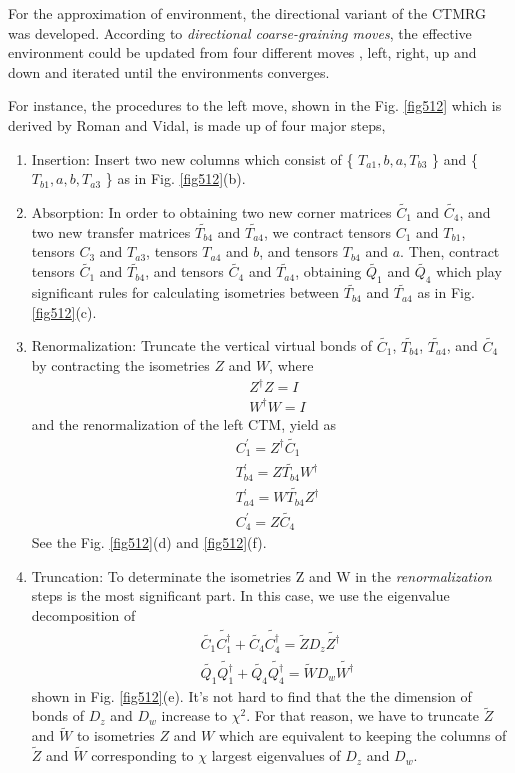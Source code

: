 For the approximation of environment, the directional variant of the CTMRG was developed. According to \textit{directional coarse-graining moves}, the effective environment could be updated from four different moves , left, right, up and down and iterated until the environments converges. 

For instance, the procedures to the left move, shown in the Fig. \ref{fig512} which is derived by Roman and Vidal, is made up of four major steps,
\begin{enumerate}
	\item Insertion: Insert two new columns which consist of \{ $T_{a1},b,a,T_{b3}$ \} and \{ $T_{b1},a,b,T_{a3}$ \} as in Fig. \ref{fig512}(b).
	\item Absorption: In order to obtaining two new corner matrices $\tilde{C_1}$ and $\tilde{C_4}$, and two new transfer matrices $\tilde{T_{b4}}$ and $\tilde{T_{a4}}$, we contract tensors $C_1$ and $T_{b1}$, tensors $C_3$ and $T_{a3}$, tensors $T_{a4}$ and $b$, and tensors $T_{b4}$ and $a$. Then, contract tensors $\tilde{C_1}$ and $\tilde{T_{b4}}$, and tensors $\tilde{C_4}$ and $\tilde{T_{a4}}$, obtaining $\tilde{Q_1}$ and $\tilde{Q_4}$ which play significant rules for calculating isometries between $\tilde{T_{b4}}$ and $\tilde{T_{a4}}$ as in Fig. \ref{fig512}(c).
	\item Renormalization: Truncate the vertical virtual bonds of $\widetilde{C_1}$, $\widetilde{T_{b4}}$, $\widetilde{T_{a4}}$, and $\widetilde{C_4}$ by contracting the isometries $Z$ and $W$, where
\begin{align}
	\label{isometry}
	&Z^{\dagger}Z = I \\
	&W^{\dagger}W = I
\end{align}
and the renormalization of the left CTM, yield as
\begin{align}
	\label{renormalize}
	&C^{\prime}_1 = Z^{\dagger} \tilde{C_1} \\
	&T_{b4}^{\prime} = Z\tilde{T_{b4}}W^{\dagger} \\
	&T_{a4}^{\prime} = W\tilde{T_{b4}}Z^{\dagger} \\
	&C^{\prime}_4 = Z\widetilde{C_4}
\end{align}
See the Fig. \ref{fig512}(d) and \ref{fig512}(f).
	\item Truncation: To determinate the isometries Z and W in the \textit{renormalization} steps is the most significant part. In this case, we use the eigenvalue decomposition of 
		\begin{align}
			\label{eigh_ctm}
			&\tilde{C_1}\tilde{C^{\dagger}_1}+\tilde{C_4}\tilde{C^{\dagger}_4}= \tilde{Z} D_z \tilde{Z^{\dagger}}\\
			&\tilde{Q_1}\tilde{Q^{\dagger}_1}+\tilde{Q_4}\tilde{Q^{\dagger}_4}= \tilde{W} D_w \tilde{W^{\dagger}}
		\end{align}
		shown in Fig. \ref{fig512}(e). It's not hard to find that the 
		the dimension of bonds of $D_z$ and $D_w$ increase to $\chi^2$. For that reason, we have to truncate $\tilde{Z}$ and $\tilde{W}$ to isometries $Z$ and $W$ which are equivalent to keeping the columns of $\tilde{Z}$ and $\tilde{W}$ corresponding to $\chi$ largest eigenvalues of $D_z$ and $D_w$.
\end{enumerate}


